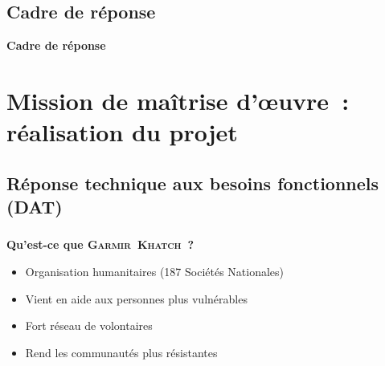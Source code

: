 \documentclass[10pt,fleqn]{beamer}
\newcommand{\mo}{\textsc{Garmir~Khatch}}
\begin{document}
\subsection{Cadre de réponse}
\begin{frame}
\begin{block}{\vspace{1cm}\begin{center}\textbf{Cadre de réponse} \end{center}\vspace{1cm}}
\end{block}
\end{frame}



\section[Mission de maîtrise d'œuvre~: réalisation du projet]{Mission de maîtrise d'œuvre~: réalisation du projet}


\subsection[Réponse technique aux besoins fonctionnels (DAT)]{Réponse technique aux besoins fonctionnels (DAT)}
\begin{frame}
\frametitle{}
\begin{block}{\textbf{Qu'est-ce que \mo~?}}
\begin{itemize}
\item Organisation humanitaires (187 Sociétés Nationales)
\item Vient en aide aux personnes plus vulnérables
\item Fort réseau de volontaires
\item Rend les communautés plus résistantes
\end{itemize}
\end{block}
\end{frame}

\end{document}
